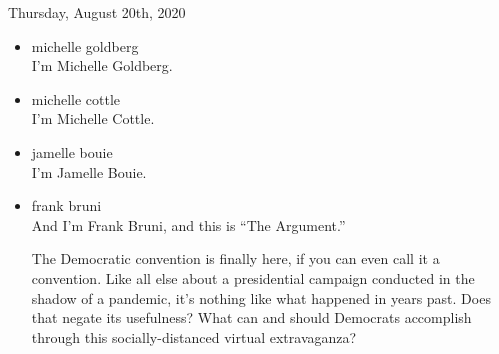 Thursday, August 20th, 2020

\begin{itemize}
\item
  michelle goldberg\\
  I'm Michelle Goldberg.
\item
  michelle cottle\\
  I'm Michelle Cottle.
\item
  jamelle bouie\\
  I'm Jamelle Bouie.
\item
  frank bruni\\
  And I'm Frank Bruni, and this is ``The Argument.''

  The Democratic convention is finally here, if you can even call it a
  convention. Like all else about a presidential campaign conducted in
  the shadow of a pandemic, it's nothing like what happened in years
  past. Does that negate its usefulness? What can and should Democrats
  accomplish through this socially-distanced virtual extravaganza?


\end{itemize}
